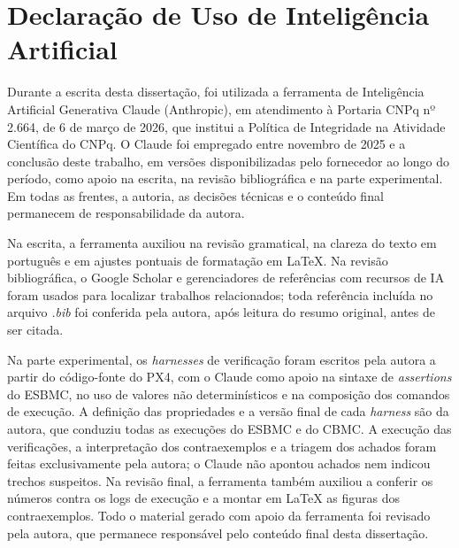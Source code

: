 \chapter*{Declaração de Uso de Inteligência Artificial}
\vspace*{-0.9cm}

{\small

Durante a escrita desta dissertação, foi utilizada a ferramenta de Inteligência Artificial Generativa Claude (Anthropic), em atendimento à Portaria CNPq nº 2.664, de 6 de março de 2026, que institui a Política de Integridade na Atividade Científica do CNPq. O Claude foi empregado entre novembro de 2025 e a conclusão deste trabalho, em versões disponibilizadas pelo fornecedor ao longo do período, como apoio na escrita, na revisão bibliográfica e na parte experimental. Em todas as frentes, a autoria, as decisões técnicas e o conteúdo final permanecem de responsabilidade da autora.

Na escrita, a ferramenta auxiliou na revisão gramatical, na clareza do texto em português e em ajustes pontuais de formatação em LaTeX. Na revisão bibliográfica, o Google Scholar e gerenciadores de referências com recursos de IA foram usados para localizar trabalhos relacionados; toda referência incluída no arquivo \textit{.bib} foi conferida pela autora, após leitura do resumo original, antes de ser citada.

Na parte experimental, os \textit{harnesses} de verificação foram escritos pela autora a partir do código-fonte do PX4, com o Claude como apoio na sintaxe de \textit{assertions} do ESBMC, no uso de valores não determinísticos e na composição dos comandos de execução. A definição das propriedades e a versão final de cada \textit{harness} são da autora, que conduziu todas as execuções do ESBMC e do CBMC. A execução das verificações, a interpretação dos contraexemplos e a triagem dos achados foram feitas exclusivamente pela autora; o Claude não apontou achados nem indicou trechos suspeitos. Na revisão final, a ferramenta também auxiliou a conferir os números contra os logs de execução e a montar em \LaTeX{} as figuras dos contraexemplos. Todo o material gerado com apoio da ferramenta foi revisado pela autora, que permanece responsável pelo conteúdo final desta dissertação.

\par}

